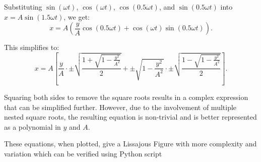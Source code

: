 \documentclass[12pt]{article}
\begin{document}
Substituting \( \sin(\omega t) \), \( \cos(\omega t) \), \( \cos(0.5\omega t) \), and \( \sin(0.5\omega t) \) into \( x = A \sin(1.5\omega t) \), we get:
\[
x = A \left( \frac{y}{A}\cos(0.5\omega t) + \cos(\omega t)\sin(0.5\omega t) \right).
\]

This simplifies to:
\[
x = A \left[ \frac{y}{A} \cdot \pm \sqrt{\frac{1 + \sqrt{1 - \frac{y^2}{A^2}}}{2}} + \pm \sqrt{1 - \frac{y^2}{A^2}} \cdot \pm \sqrt{\frac{1 - \sqrt{1 - \frac{y^2}{A^2}}}{2}} \right].
\]

Squaring both sides to remove the square roots results in a complex expression that can be simplified further. However, due to the involvement of multiple nested square roots, the resulting equation is non-trivial and is better represented as a polynomial in \( y \) and \( A \).


These equations, when plotted, give a Lissajous Figure with more complexity and variation which can be verified using Python script
\end{document}
